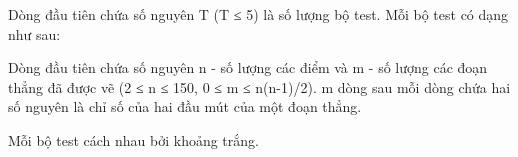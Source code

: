 Dòng đầu tiên chứa số nguyên T (T ≤ 5) là số lượng bộ test. Mỗi bộ test có dạng như sau:  

   Dòng đầu tiên chứa số nguyên n - số lượng các điểm và m - số lượng các đoạn thẳng đã được vẽ (2 ≤ n ≤ 150, 0 ≤ m ≤ n(n-1)/2). m dòng sau mỗi dòng chứa hai số nguyên là chỉ số của hai đầu mút của một đoạn thẳng.  

   Mỗi bộ test cách nhau bởi khoảng trắng.  

\